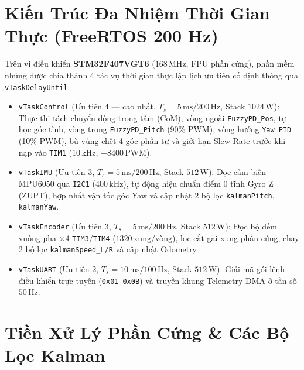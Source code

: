 \documentclass[10pt,a4paper,twocolumn]{article}
\begin{document}
\section{Kiến Trúc Đa Nhiệm Thời Gian Thực (FreeRTOS 200 Hz)}
Trên vi điều khiển \textbf{STM32F407VGT6} ($168\,\text{MHz}$, FPU phần cứng), phần mềm nhúng được chia thành 4 tác vụ thời gian thực lập lịch ưu tiên cố định thông qua \texttt{vTaskDelayUntil}:
\begin{itemize}
    \item \texttt{vTaskControl} (Ưu tiên 4 --- cao nhất, $T_s = 5\,\text{ms} / 200\,\text{Hz}$, Stack $1024\,\text{W}$): Thực thi tách chuyển động trọng tâm (CoM), vòng ngoài \texttt{FuzzyPD\_Pos}, tự học góc tĩnh, vòng trong \texttt{FuzzyPD\_Pitch} (90\% PWM), vòng hướng \texttt{Yaw PID} (10\% PWM), bù vùng chết 4 góc phần tư và giới hạn Slew-Rate trước khi nạp vào \texttt{TIM1} ($10\,\text{kHz}$, $\pm 8400\,\text{PWM}$).
    \item \texttt{vTaskIMU} (Ưu tiên 3, $T_s = 5\,\text{ms} / 200\,\text{Hz}$, Stack $512\,\text{W}$): Đọc cảm biến MPU6050 qua \texttt{I2C1} ($400\,\text{kHz}$), tự động hiệu chuẩn điểm 0 tĩnh Gyro Z (ZUPT), hợp nhất vận tốc góc Yaw và cập nhật 2 bộ lọc \texttt{kalmanPitch}, \texttt{kalmanYaw}.
    \item \texttt{vTaskEncoder} (Ưu tiên 3, $T_s = 5\,\text{ms} / 200\,\text{Hz}$, Stack $512\,\text{W}$): Đọc bộ đếm vuông pha $\times 4$ \texttt{TIM3}/\texttt{TIM4} ($1320\,\text{xung/vòng}$), lọc cắt gai xung phần cứng, chạy 2 bộ lọc \texttt{kalmanSpeed\_L/R} và cập nhật Odometry.
    \item \texttt{vTaskUART} (Ưu tiên 2, $T_s = 10\,\text{ms} / 100\,\text{Hz}$, Stack $512\,\text{W}$): Giải mã gói lệnh điều khiển trực tuyến (\texttt{0x01}--\texttt{0x0B}) và truyền khung Telemetry DMA ở tần số $50\,\text{Hz}$.
\end{itemize}

\section{Tiền Xử Lý Phần Cứng \& Các Bộ Lọc Kalman}
\end{document}
